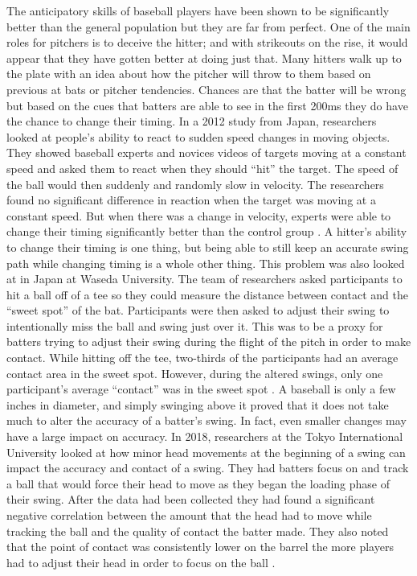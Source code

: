 \documentclass{article}
\begin{document}
\begin{doublespace}
The anticipatory skills of baseball players have been shown to be significantly better than the general population but they are far from perfect. One of the main roles for pitchers is to deceive the hitter; and with strikeouts on the rise, it would appear that they have gotten better at doing just that. Many hitters walk up to the plate with an idea about how the pitcher will throw to them based on previous at bats or pitcher tendencies. Chances are that the batter will be wrong but based on the cues that batters are able to see in the first 200ms they do have the chance to change their timing. In a 2012 study from Japan, researchers looked at people’s ability to react to sudden speed changes in moving objects. They showed baseball experts and novices videos of targets moving at a constant speed and asked them to react when they should “hit” the target. The speed of the ball would then suddenly and randomly slow in velocity. The researchers found no significant difference in reaction when the target was moving at a constant speed. But when there was a change in velocity, experts were able to change their timing significantly better than the control group \citep{Nakamoto}. A hitter’s ability to change their timing is one thing, but being able to still keep an accurate swing path while changing timing is a whole other thing. This problem was also looked at in Japan at Waseda University. The team of researchers asked participants to hit a ball off of a tee so they could measure the distance between contact and the “sweet spot” of the bat. Participants were then asked to adjust their swing to intentionally miss the ball and swing just over it. This was to be a proxy for batters trying to adjust their swing during the flight of the pitch in order to make contact. While hitting off the tee, two-thirds of the participants had an average contact area in the sweet spot. However, during the altered swings, only one participant’s average “contact” was in the sweet spot \citep{Higuchi}.  A baseball is only a few inches in diameter, and simply swinging above it proved that it does not take much to alter the accuracy of a batter’s swing. In fact, even smaller changes may have a large impact on accuracy. In 2018, researchers at the Tokyo International University looked at how minor head movements at the beginning of a swing can impact the accuracy and contact of a swing. They had batters focus on and track a ball that would force their head to move as they began the loading phase of their swing. After the data had been collected they had found a significant negative correlation between the amount that the head had to move while tracking the ball and the quality of contact the batter made. They also noted that the point of contact was consistently lower on the barrel the more players had to adjust their head in order to focus on the ball \citep{Akaike}. 


\end{doublespace}
\end{document}
